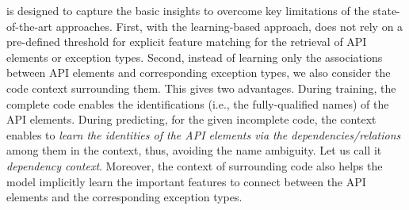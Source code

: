 {\tool} is designed to capture the basic insights to overcome key
limitations of the state-of-the-art approaches. First, with the
learning-based approach, {\tool} does not rely on a pre-defined
threshold for explicit feature matching for the retrieval of API
elements or exception types. Second, instead of learning only the
associations between API elements and corresponding exception types,
we also consider the code context surrounding them. This gives {\tool}
two advantages. During training, the complete code enables the
identifications (i.e., the fully-qualified names) of the API
elements. During predicting, for the given incomplete code, the
context enables {\tool} to {\em learn the identities of the API
  elements via the dependencies/relations} among them in the context,
thus, avoiding the name ambiguity. Let us call it {\em dependency
  context}. Moreover, the context of surrounding code also helps the
model implicitly learn the important features to connect between the
API elements and the corresponding exception types.


